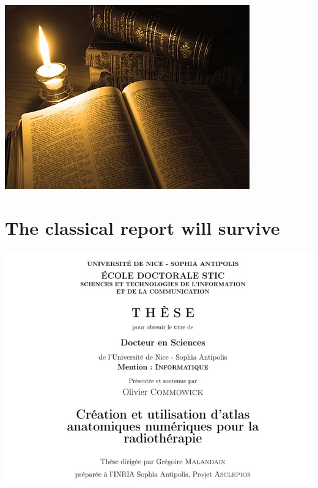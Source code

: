 \documentclass[%
twoside,                 %
final,                   %
chapterprefix=true,      %
open=right               %
10pt]{book}
\begin{document}
\begin{center}  %
  \centerline{\includegraphics[width=0.9\linewidth]{fig/oldbooks.jpg}}
\end{center}


\section*{The classical report will survive}


\begin{center}  %
  \centerline{\includegraphics[width=1.2\linewidth]{fig/latex_thesis.jpg}}
\end{center}

\end{document}

